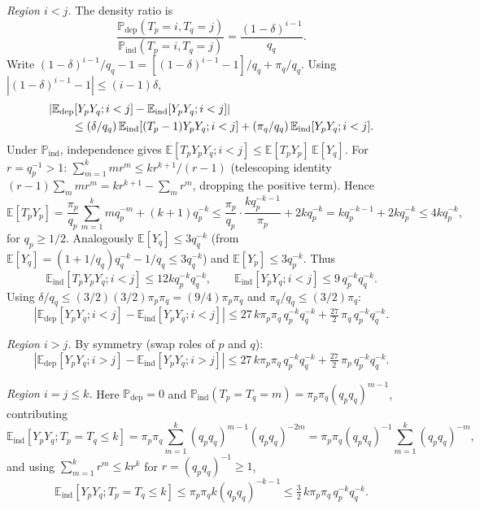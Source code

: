 \documentclass[11pt]{article}
\theoremstyle{remark}
\newcommand{\PP}{\mathbb{P}}
\newcommand{\EE}{\mathbb{E}}
\begin{document}
\textit{Region $i < j$.} The density ratio is
\[
\frac{\PP_{\mathrm{dep}}(T_p = i, T_q = j)}{\PP_{\mathrm{ind}}(T_p = i, T_q = j)} = \frac{(1-\delta)^{i-1}}{q_q}.
\]
Write $(1-\delta)^{i-1}/q_q - 1 = [(1-\delta)^{i-1} - 1]/q_q + \pi_q/q_q$. Using $|(1-\delta)^{i-1} - 1| \leq (i-1)\delta$,
\begin{align*}
&|\EE_{\mathrm{dep}}[Y_p Y_q; i < j]
 - \EE_{\mathrm{ind}}[Y_p Y_q; i < j]|\notag\\
&\qquad\leq (\delta/q_q)\,
\EE_{\mathrm{ind}}[(T_p-1)Y_pY_q; i<j]
 +(\pi_q/q_q)\,\EE_{\mathrm{ind}}[Y_pY_q; i<j].
\end{align*}
Under $\PP_{\mathrm{ind}}$, independence gives $\EE[T_p Y_p Y_q; i < j] \leq \EE[T_p Y_p]\, \EE[Y_q]$. For $r = q_p^{-1} > 1$: $\sum_{m=1}^k m r^m \leq k r^{k+1}/(r-1)$ (telescoping identity $(r-1) \sum_m m r^m = k r^{k+1} - \sum_m r^m$, dropping the positive term). Hence
\[
\EE[T_p Y_p] = \frac{\pi_p}{q_p} \sum_{m=1}^k m q_p^{-m} + (k+1) q_p^{-k} \leq \frac{\pi_p}{q_p} \cdot \frac{k q_p^{-k-1}}{\pi_p} + 2k q_p^{-k} = k q_p^{-k-1} + 2k q_p^{-k} \leq 4k q_p^{-k},
\]
for $q_p \geq 1/2$. Analogously $\EE[Y_q] \leq 3 q_q^{-k}$ (from $\EE[Y_q] = (1 + 1/q_q) q_q^{-k} - 1/q_q \leq 3 q_q^{-k}$) and $\EE[Y_p] \leq 3 q_p^{-k}$. Thus
\[
\EE_{\mathrm{ind}}[T_p Y_p Y_q; i < j] \leq 12k q_p^{-k} q_q^{-k}, \qquad \EE_{\mathrm{ind}}[Y_p Y_q; i<j] \leq 9\, q_p^{-k} q_q^{-k}.
\]
Using $\delta/q_q \leq (3/2)(3/2)\pi_p \pi_q = (9/4)\pi_p \pi_q$ and $\pi_q/q_q \leq (3/2)\pi_q$:
\begin{equation}\label{eq:region-ij}
|\EE_{\mathrm{dep}}[Y_p Y_q; i < j] - \EE_{\mathrm{ind}}[Y_p Y_q; i < j]| \leq 27\, k \pi_p \pi_q\, q_p^{-k} q_q^{-k} + \tfrac{27}{2}\, \pi_q\, q_p^{-k} q_q^{-k}.
\end{equation}

\textit{Region $i > j$.} By symmetry (swap roles of $p$ and $q$):
\begin{equation}\label{eq:region-ji}
|\EE_{\mathrm{dep}}[Y_p Y_q; i > j] - \EE_{\mathrm{ind}}[Y_p Y_q; i > j]| \leq 27\, k \pi_p \pi_q\, q_p^{-k} q_q^{-k} + \tfrac{27}{2}\, \pi_p\, q_p^{-k} q_q^{-k}.
\end{equation}

\textit{Region $i = j \leq k$.} Here $\PP_{\mathrm{dep}} = 0$ and $\PP_{\mathrm{ind}}(T_p = T_q = m) = \pi_p \pi_q (q_p q_q)^{m-1}$, contributing
\[
\EE_{\mathrm{ind}}[Y_p Y_q; T_p = T_q \leq k] = \pi_p \pi_q \sum_{m=1}^{k} (q_p q_q)^{m-1} (q_p q_q)^{-2m} = \pi_p \pi_q (q_p q_q)^{-1} \sum_{m=1}^k (q_p q_q)^{-m},
\]
and using $\sum_{m=1}^k r^m \leq k r^k$ for $r = (q_p q_q)^{-1} \geq 1$,
\begin{equation}\label{eq:region-eq}
\EE_{\mathrm{ind}}[Y_p Y_q; T_p = T_q \leq k] \leq \pi_p \pi_q k (q_p q_q)^{-k-1} \leq \tfrac{3}{2}\, k \pi_p \pi_q\, q_p^{-k} q_q^{-k}.
\end{equation}
\end{document}

